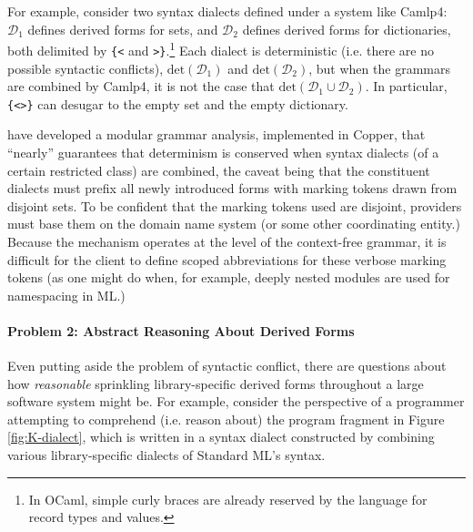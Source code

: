 \documentclass[acmlarge,review,anonymous]{acmart}\settopmatter{printfolios=true}
\begin{document}
For example, consider two syntax dialects defined under a system like Camlp4: $\mathcal{D}_1$ defines derived forms for sets, and $\mathcal{D}_2$ defines derived forms for dictionaries, both delimited by \verb~{<~ and \verb~>}~.\footnote{In OCaml, simple curly braces are already reserved by the language for record types and values.} Each dialect is deterministic (i.e. there are no possible syntactic conflicts), $\mathrm{det}(\mathcal{D}_1)$ and $\mathrm{det}(\mathcal{D}_2)$, but when the grammars are combined by Camlp4, it is not the case that $\mathrm{det}(\mathcal{D}_1 \cup \mathcal{D}_2)$. In particular, \verb~{<>}~ can desugar to the empty set and the empty dictionary.%

\citet{conf/pldi/SchwerdfegerW09} have developed a modular grammar analysis, implemented in Copper, that ``nearly'' guarantees that determinism is conserved when syntax dialects (of a certain restricted class) are combined, the caveat being that the constituent dialects must prefix all newly introduced forms with marking tokens drawn from disjoint sets. To be confident that the marking tokens used are disjoint, providers must base them on the domain name system (or some other coordinating entity.) Because the mechanism operates at the level of the context-free grammar, it is difficult for the client to define scoped abbreviations for these verbose marking tokens (as one might do when, for example, deeply nested modules are used for namespacing in ML.)

\paragraph{Problem 2: Abstract Reasoning About Derived Forms}

Even putting aside the problem of syntactic conflict, there are questions about how \emph{reasonable}  sprinkling library-specific derived forms throughout a large software system might be. 
For example, consider the perspective of a programmer attempting to comprehend (i.e. reason about) the program fragment in Figure \ref{fig:K-dialect}, which is written in a syntax dialect constructed by combining various library-specific dialects of Standard ML's syntax.
\end{document}
